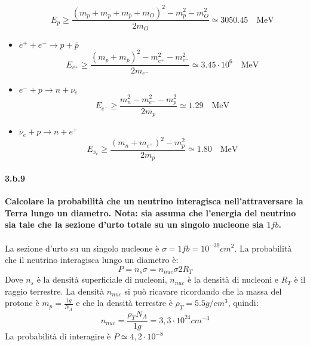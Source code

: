 \documentclass[twoside]{article}
\begin{document}
\begin{itemize}
\begin{equation*}
E_p \geq \frac{(m_p+m_p+m_{\overline{p}}+m_O)^2-m_p^2-m_O^2}{2m_O} \simeq 3050.45 \quad \text{MeV}
\end{equation*}
\item $e^+ +e^- \longrightarrow p+\overline{p} $
\begin{equation*}
E_{e^+} \geq \frac{(m_p+m_{\overline{p}})^2-m_{e^+}^2-m_{e^-}^2}{2m_{e^-}} \simeq 3.45 \cdot 10^6 \quad \text{MeV}	
\end{equation*}
\item $e^- + p \longrightarrow n+\nu_e $
\begin{equation*}
E_{e^-} \geq \frac{m_n^2-m_{e^-}^2-m_p^2}{2m_p} \simeq 1.29 \quad \text{MeV}
\end{equation*}
\item $\overline{\nu}_e + p \longrightarrow n + e^+ $
\begin{equation*}
E_{\overline{\nu}_e} \geq \frac{(m_n+m_{e^+})^2-m_p^2}{2m_p} \simeq 1.80 \quad \text{MeV}
\end{equation*}
\end{itemize}



\paragraph{3.b.9}\textbf{Calcolare la probabilità che un neutrino interagisca nell’attraversare la Terra lungo un diametro. Nota: sia assuma che l’energia del neutrino sia tale che la sezione d’urto totale su un singolo nucleone sia $1fb$.}\\
\\
La sezione d'urto su un singolo nucleone è $\sigma=1fb=10^{-39}cm^2$. La probabilità che il neutrino interagisca lungo un diametro è:
\begin{equation}
    P=n_s\sigma=n_{nuc}\sigma2R_T
\end{equation}
Dove $n_s$ è la densità superficiale di nucleoni, $n_{nuc}$ è la densità di nucleoni e $R_T$ è il raggio terrestre. La densità $n_{nuc}$ si può ricavare ricordando che la massa del protone è $m_p=\frac{1g}{N_A}$ e che la densità terrestre è $\rho_T=5.5g/cm^3$, quindi:
\begin{equation}
    n_{nuc}=\frac{\rho_TN_A}{1g}=3,3\cdot10^{24}cm^{-3}
\end{equation}
La probabilità di interagire è $P\simeq4,2\cdot10^{-8}$
\end{document}
